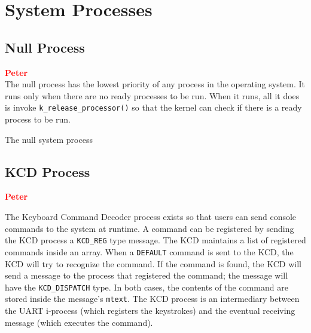 \documentclass[12pt]{report}
\begin{document}

\section{System Processes}

\subsection{Null Process}

\textcolor{red}{\textbf{Peter}} \\

The null process has the lowest priority of any process in the operating system. It runs only when there are no ready processes to be run. When it runs, all it does is invoke {\tt k\_release\_processor()} so that the kernel can check if there is a ready process to be run.

\begin{algorithm}
  \caption{The null system process}
  \begin{algorithmic}[1]
			\State {}
		\EndWhile
    \EndProcedure
  \end{algorithmic}
\end{algorithm}

\subsection{KCD Process}

\textcolor{red}{\textbf{Peter}}

The Keyboard Command Decoder process exists so that users can send console commands to the system at runtime. A command can be registered by sending the KCD process a {\tt KCD\_REG} type message. The KCD maintains a list of registered commands inside an array. When a {\tt DEFAULT} command is sent to the KCD, the KCD will try to recognize the command. If the command is found, the KCD will send a message to the process that registered the command; the message will have the {\tt KCD_DISPATCH} type. In both cases, the contents of the command are stored inside the message's {\tt mtext}. The KCD process is an intermediary between the UART i-process (which registers the keystrokes) and the eventual receiving message (which executes the command).\\
\end{document}
